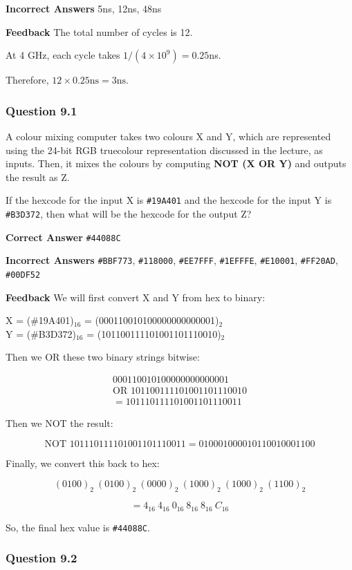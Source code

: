 \textbf{Incorrect Answers}
5ns, 12ns, 48ns

\textbf{Feedback}
The total number of cycles is 12.

At 4 GHz, each cycle takes $1/(4 \times 10^9) = 0.25$ns.

Therefore, $12 \times 0.25\text{ns} = 3\text{ns}$.
\subsubsection{Question 9.1}

A colour mixing computer takes two colours X and Y, which are represented using the 24-bit RGB truecolour representation discussed in the lecture, as inputs. Then, it mixes the colours by computing \textbf{NOT (X OR Y)} and outputs the result as Z.

If the hexcode for the input X is \texttt{\#19A401} and the hexcode for the input Y is \texttt{\#B3D372}, then what will be the hexcode for the output Z?

\textbf{Correct Answer}
\texttt{\#44088C}

\textbf{Incorrect Answers}
\texttt{\#BBF773}, \texttt{\#118000}, \texttt{\#EE7FFF}, \texttt{\#1EFFFE}, \texttt{\#E10001}, \texttt{\#FF20AD}, \texttt{\#00DF52}

\textbf{Feedback}
We will first convert X and Y from hex to binary:

X = (\#19A401)$_{16}$ = (000110010100000000000001)$_2$ \\
Y = (\#B3D372)$_{16}$ = (101100111101001101110010)$_2$

Then we OR these two binary strings bitwise:

\begin{align*}
000110010100000000000001 \\
\text{OR } 101100111101001101110010 \\
= 101110111101001101110011
\end{align*}

Then we NOT the result:

\[
\text{NOT } 101110111101001101110011 = 010001000010110010001100
\]

Finally, we convert this back to hex:

\[
(0100)_2 \ (0100)_2 \ (0000)_2 \ (1000)_2 \ (1000)_2 \ (1100)_2
\]

\[
= 4_{16} \ 4_{16} \ 0_{16} \ 8_{16} \ 8_{16} \ C_{16}
\]

So, the final hex value is \texttt{\#44088C}.

\subsubsection{Question 9.2}

